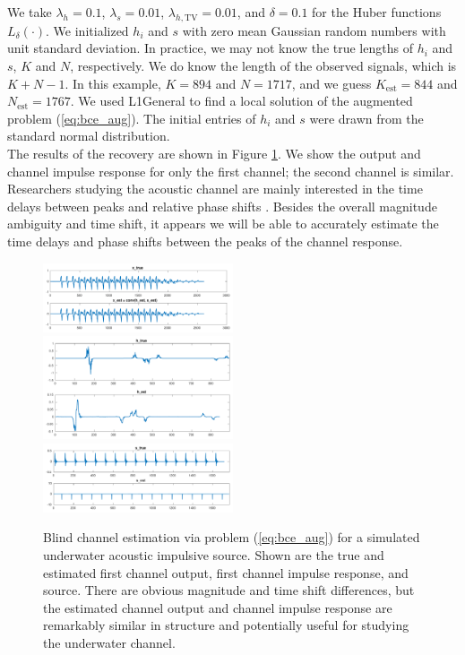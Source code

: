 \documentclass[journal]{IEEEtran}
\begin{document}
We take $\lambda_h = 0.1$, $\lambda_s=0.01$, $\lambda_{h,\text{TV}}=0.01$, and $\delta=0.1$ for the Huber functions $L_\delta(\cdot)$.  We initialized $h_i$ and $s$ with zero mean Gaussian random numbers with unit standard deviation.  In practice, we may not know the true lengths of $h_i$ and $s$, $K$ and $N$, respectively.  We do know the length of the observed signals, which is $K+N-1$.  In this example, $K=894$ and $N=1717$, and we guess $K_\text{est}=844$ and $N_\text{est}=1767$.  We used L1General \cite{schmidt_2010} to find a local solution of the augmented problem (\ref{eq:bce_aug}).  The initial entries of $h_i$ and $s$ were drawn from the standard normal distribution.\\

The results of the recovery are shown in Figure \ref{fig:bce_rec}.  We show the output and channel impulse response for only the first channel; the second channel is similar.  Researchers studying the acoustic channel are mainly interested in the time delays between peaks and relative phase shifts \cite{rideout_2016}.  Besides the overall magnitude ambiguity and time shift, it appears we will be able to accurately estimate the time delays and phase shifts between the peaks of the channel response.

\begin{figure}
   \centering
   \includegraphics[width=0.5\textwidth]{figures/bce_rec_004_x_trim.pdf}
   \includegraphics[width=0.5\textwidth]{figures/bce_rec_004_h_trim.pdf}
   \includegraphics[width=0.5\textwidth]{figures/bce_rec_004_s_trim.pdf}
   \caption{Blind channel estimation via problem (\ref{eq:bce_aug}) for a simulated underwater acoustic impulsive source.  Shown are the true and estimated first channel output, first channel impulse response, and source.  There are obvious magnitude and time shift differences, but the estimated channel output and channel impulse response are remarkably similar in structure and potentially useful for studying the underwater channel.}
   \label{fig:bce_rec}
\end{figure}
\end{document}
